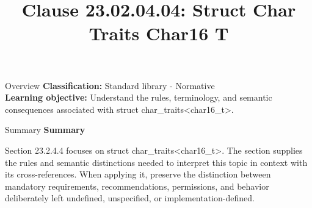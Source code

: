 \documentclass[10pt,letterpaper]{article}
\title{Clause 23.02.04.04: Struct Char Traits Char16 T}
\author{}
\date{}
\begin{document}
\maketitle
\begin{CornellOverviewBox}{Overview}
\textbf{Classification:} Standard library - Normative\\[2pt]
\textbf{Learning objective:} Understand the rules, terminology, and semantic consequences associated with struct char\_traits<char16\_t>.
\end{CornellOverviewBox}\begin{CornellSummaryBox}{Summary}
{\sffamily\bfseries\color{Accent} Summary}\par\vspace{3pt}Section 23.2.4.4 focuses on struct char\_traits<char16\_t>. The section supplies the rules and semantic distinctions needed to interpret this topic in context with its cross-references. When applying it, preserve the distinction between mandatory requirements, recommendations, permissions, and behavior deliberately left undefined, unspecified, or implementation-defined.
\end{CornellSummaryBox}
\end{document}
